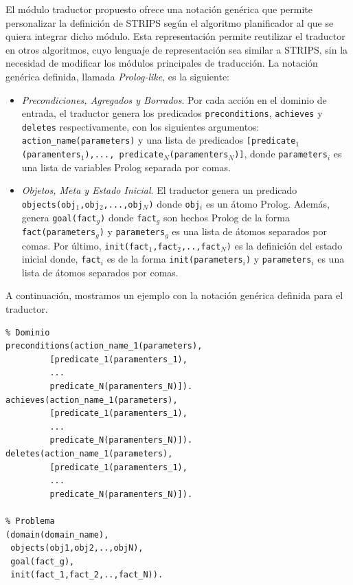        El m\'odulo traductor propuesto ofrece una notaci\'on
        gen\'erica que permite personalizar la definici\'on de STRIPS
        seg\'un el algoritmo planificador al que se quiera
        integrar dicho m\'odulo. Esta representaci\'on
        permite reutilizar el traductor en otros
        algoritmos, cuyo lenguaje de representaci\'on sea similar a STRIPS,
        sin la necesidad de modificar los m\'odulos principales de traducci\'on.
        La notaci\'on gen\'erica definida, llamada 
        \emph{Prolog-like}, es la siguiente:


        \begin{itemize}

        \item \emph{Precondiciones, Agregados y Borrados}. Por cada acci\'on en el dominio de
        entrada, el traductor genera los predicados \texttt{preconditions}, \texttt{achieves}
        y \texttt{deletes} respectivamente, con los siguientes
        argumentos: \texttt{action\_name(parameters)} y una lista de
        predicados \texttt{[pre\-di\-ca\-te$_{1}$(pa\-ra\-men\-ters$_{1}$),...,
        predicate$_{N}$(paramenters$_{N}$)]}, donde \texttt{parameters$_{i}$} es
        una lista de variables Prolog separada por comas. 

        \item \emph{Objetos, Meta y Estado Inicial}. El traductor genera un
        predicado \texttt{objects(obj$_{1}$,obj$_{2}$,...,obj$_{N}$)}
        donde \texttt{obj$_{i}$} es un \'atomo
        Prolog. Adem\'as, genera \texttt{goal(fact$_{g}$)} donde \texttt{fact$_{g}$} son
        hechos Prolog de la forma \texttt{fact(parameters$_{g}$)} y 
        \texttt{parameters$_{g}$} es una lista de \'atomos separados
        por comas. Por \'ultimo,
        \texttt{init(fact$_{1}$,fact$_{2}$,..,fact$_{N}$)} es la
        definici\'on del estado inicial
        donde, \texttt{fact$_{i}$} es de la
        forma \texttt{init(parameters$_{i}$)}
        y \texttt{parameters$_{i}$} es una lista de \'atomos separados
        por comas. 
 
        \end{itemize}

        A continuaci\'on, mostramos un ejemplo con la notaci\'on
        gen\'erica definida para el traductor.

        \begin{ejemplo}
        \begin{verbatim}
% Dominio	
preconditions(action_name_1(parameters), 
         [predicate_1(paramenters_1), 
         ...
         predicate_N(paramenters_N)]).   
achieves(action_name_1(parameters),
         [predicate_1(paramenters_1),
         ...
         predicate_N(paramenters_N)]).
deletes(action_name_1(parameters),
         [predicate_1(paramenters_1),
         ...
         predicate_N(paramenters_N)]).

% Problema
(domain(domain_name),
 objects(obj1,obj2,..,objN),
 goal(fact_g),
 init(fact_1,fact_2,..,fact_N)).
        \end{verbatim}
        \end{ejemplo}

